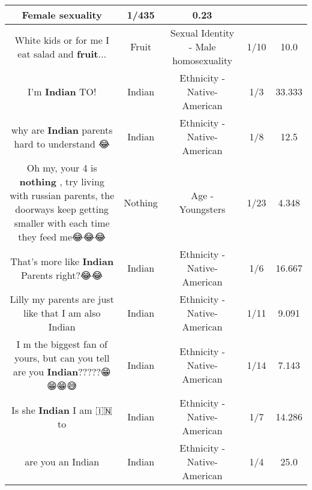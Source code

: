 \documentclass[11pt]{article}
\newlength\mylength
\begin{document}
\begin{center}
\begin{longtable}{|C{.65\mylength}|C{.30\mylength}|C{.12\mylength}|C{.12\mylength}|C{.12\mylength}|}
Female sexuality & 1/435 & 0.23 \\  \hline
  \small White kids or for me I eat salad and \textbf{fruit}...\normalsize   & Fruit & Sexual Identity - Male homosexuality & 1/10 & 10.0 \\  \hline
  \small I'm \textbf{Indian} TO!\normalsize   & Indian & Ethnicity - Native-American & 1/3 & 33.333 \\  \hline
  \small why are \textbf{Indian} parents hard to understand 😂\normalsize   & Indian & Ethnicity - Native-American & 1/8 & 12.5 \\  \hline
  \small Oh my, your 4 is \textbf{nothing} , try living with russian parents, the doorways keep getting smaller with each time they feed me😂😂😂\normalsize   & Nothing & Age - Youngsters & 1/23 & 4.348 \\  \hline
  \small That's more like \textbf{Indian} Parents right?😂😂\normalsize   & Indian & Ethnicity - Native-American & 1/6 & 16.667 \\  \hline
  \small Lilly my parents are just like that  I am also Indian\normalsize   & Indian & Ethnicity - Native-American & 1/11 & 9.091 \\  \hline
  \small I m the biggest fan of yours, but can you tell are you \textbf{Indian}?????😁😁😁😅\normalsize   & Indian & Ethnicity - Native-American & 1/14 & 7.143 \\  \hline
  \small Is she \textbf{Indian} I am 🇮🇳 to\normalsize   & Indian & Ethnicity - Native-American & 1/7 & 14.286 \\  \hline
  \small are you an Indian\normalsize   & Indian & Ethnicity - Native-American & 1/4 & 25.0 \\  \hline

\end{longtable}
\end{center}
\end{document}
